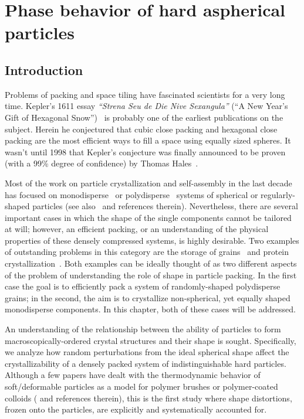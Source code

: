 \chapter{Phase behavior of hard aspherical particles}
\label{chap:aspherical}

\section{Introduction}
Problems of packing and space tiling have fascinated scientists for a very long time.
Kepler's 1611 essay {\it ``Strena Seu de Die Nive Sexangula''} (``A New Year's Gift of Hexagonal Snow'')~\cite{Kepler} is probably one of the earliest publications on the subject.
Herein he conjectured that cubic close packing and hexagonal close packing are the most efficient ways to fill a space using equally sized spheres.
It wasn't until 1998 that Kepler's conjecture was finally announced to be proven (with a 99\% degree of confidence) by Thomas Hales~\cite{Hales}.

Most of the work on particle crystallization and self-assembly in the last decade has focused on monodisperse~\cite{frenkel1} or polydisperse~\cite{frenkel2,zaccarelli} systems of spherical or regularly-shaped particles (see also~\cite{glotzer,chandler,geissler,cacciuto,torquato,frenkel,glotzer2,glotzer3,glotzer4,esco,weitz} and references therein).
Nevertheless, there are several important cases in which the shape of the single components cannot be tailored at will; however, an efficient packing, or an understanding of the physical properties of these densely compressed systems, is highly desirable.
Two examples of outstanding problems in this category are the storage of grains~\cite{deGennes} and protein crystallization~\cite{rosenberger}.
Both examples can be ideally thought of as two different aspects of the problem of understanding the role of shape in particle packing.
In the first case the goal is to efficiently pack a system of randomly-shaped polydisperse grains; 
in the second, the aim is to crystallize non-spherical, yet equally shaped monodisperse components. 
In this chapter, both of these cases will be addressed. 

An understanding of the relationship between the ability of particles to form macroscopically-ordered crystal structures and their shape is sought.
Specifically, we analyze how random perturbations from the ideal spherical shape affect the crystallizability of a densely packed system of indistinguishable hard particles.
Although a few papers have  dealt with the thermodynamic behavior of soft/deformable particles as a model for polymer brushes or polymer-coated colloids (\cite{pamies,capone,richter,bozorgui} and references therein), this is the first study where shape distortions, frozen onto the particles, are explicitly and systematically accounted for.

